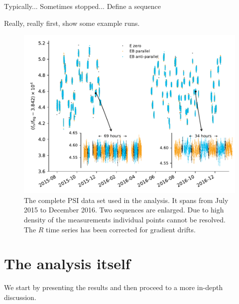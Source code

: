 Typically... Sometimes stopped... Define a sequence



Really, really first, show some example runs. 

\begin{figure}
  \centering
  \includegraphics[width=0.9\linewidth]{gfx/axions/deltah4mm_time_domain_inset_no_yerr.pdf}
  \caption{The complete PSI data set used in the analysis. It spans from July 2015 to December 2016. Two sequences are enlarged. Due to high density of the measurements individual points cannot be resolved. The $R$ time series has been corrected for gradient drifts.}
  \label{fig:PSI_dataset_time_domain}
\end{figure}


\section{The analysis itself}

We start by presenting the results and then proceed to a more in-depth discussion.





